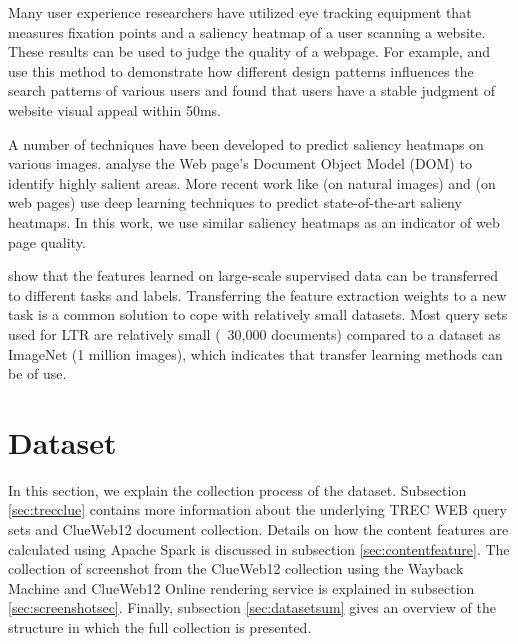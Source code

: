 Many user experience researchers have utilized eye tracking equipment that measures fixation points and a saliency heatmap of a user scanning a website. These results can be used to judge the quality of a webpage. For example, \citet{nielsen2006f} and \citet{pernice2017f} use this method to demonstrate how different design patterns influences the search patterns of various users and \citet{lindgaard2006attention} found that users have a stable judgment of website visual appeal within 50ms. 

A number of techniques have been developed to predict saliency heatmaps on various images. \citet{buscher2009you} analyse the Web page's Document Object Model (DOM) to identify highly salient areas. More recent work like \citet{kummerer2016deepgaze} (on natural images) and \citet{shan2017two} (on web pages) use deep learning techniques to predict state-of-the-art salieny heatmaps. In this work, we use similar saliency heatmaps as an indicator of web page quality. 

\citet{donahue2014decaf} show that the features learned on large-scale supervised data can be transferred to different tasks and labels. Transferring the feature extraction weights to a new task is a common solution to cope with relatively small datasets. Most query sets used for LTR are relatively small (~30,000 documents) compared to a dataset as ImageNet (1 million images), which indicates that transfer learning methods can be of use. 



\section{Dataset}\label{sec:dataset}
In this section, we explain the collection process of the \datasetname dataset. Subsection \ref{sec:trecclue} contains more information about the underlying TREC WEB query sets and ClueWeb12 document collection. Details on how the content features are calculated using Apache Spark is discussed in subsection \ref{sec:contentfeature}. The collection of screenshot from the ClueWeb12 collection using the Wayback Machine and ClueWeb12 Online rendering service is explained in subsection \ref{sec:screenshotsec}. Finally, subsection \ref{sec:datasetsum} gives an overview of the structure in which the full collection is presented.

